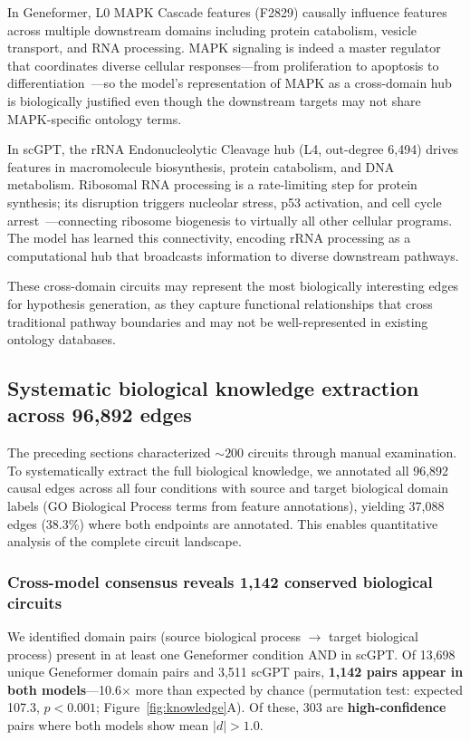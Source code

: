 \documentclass[onecolumn]{article}
\begin{document}
In Geneformer, L0 MAPK Cascade features (F2829) causally influence features across multiple downstream domains including protein catabolism, vesicle transport, and RNA processing. MAPK signaling is indeed a master regulator that coordinates diverse cellular responses---from proliferation to apoptosis to differentiation~\citep{dhillon2007map}---so the model's representation of MAPK as a cross-domain hub is biologically justified even though the downstream targets may not share MAPK-specific ontology terms.

In scGPT, the rRNA Endonucleolytic Cleavage hub (L4, out-degree 6,494) drives features in macromolecule biosynthesis, protein catabolism, and DNA metabolism. Ribosomal RNA processing is a rate-limiting step for protein synthesis; its disruption triggers nucleolar stress, p53 activation, and cell cycle arrest~\citep{boulon2010nucleolus}---connecting ribosome biogenesis to virtually all other cellular programs. The model has learned this connectivity, encoding rRNA processing as a computational hub that broadcasts information to diverse downstream pathways.

These cross-domain circuits may represent the most biologically interesting edges for hypothesis generation, as they capture functional relationships that cross traditional pathway boundaries and may not be well-represented in existing ontology databases.


\subsection{Systematic biological knowledge extraction across 96,892 edges}
\label{sec:systematic}

The preceding sections characterized ${\sim}200$ circuits through manual examination. To systematically extract the full biological knowledge, we annotated all 96,892 causal edges across all four conditions with source and target biological domain labels (GO Biological Process terms from feature annotations), yielding 37,088 edges (38.3\%) where both endpoints are annotated. This enables quantitative analysis of the complete circuit landscape.

\subsubsection{Cross-model consensus reveals 1,142 conserved biological circuits}

We identified domain pairs (source biological process $\to$ target biological process) present in at least one Geneformer condition AND in scGPT. Of 13,698 unique Geneformer domain pairs and 3,511 scGPT pairs, \textbf{1,142 pairs appear in both models}---10.6$\times$ more than expected by chance (permutation test: expected 107.3, $p < 0.001$; Figure~\ref{fig:knowledge}A). Of these, 303 are \textbf{high-confidence} pairs where both models show mean $|d| > 1.0$.
\end{document}

